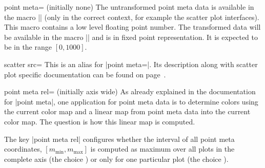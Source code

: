\begin{pgfplotskey}{point meta= (initially none)}
	The untransformed point meta data is available in the macro |\pgfplotspointmeta| (only in the correct context, for example the scatter plot interfaces). This macro contains a low level floating point number. The transformed data will be available in the macro |\pgfplotspointmetatransformed| and is in fixed point representation. It is expected to be in the range $[0,1000]$.

\end{pgfplotskey}

\begin{pgfplotskey}{scatter src=}
	This is an alias for |point meta=|. Its description along with scatter plot specific documentation can be found on page~\pageref{pgfplots:scatter:src}.
\end{pgfplotskey}

\begin{pgfplotskey}{point meta rel= (initially axis wide)}
	As already explained in the documentation for |point meta|, one application for point meta data is to determine colors using the current color map and a linear map from point meta data into the current color map. The question is how this linear map is computed. 

	The key |point meta rel| configures whether the interval of all point meta coordinates, $[m_{\text{min}},m_{\text{max}}]$ is computed as maximum over all plots in the complete axis (the choice ) or only for one particular plot (the choice ).

\begin{codeexample}[]
~
\end{codeexample}
\end{pgfplotskey}

